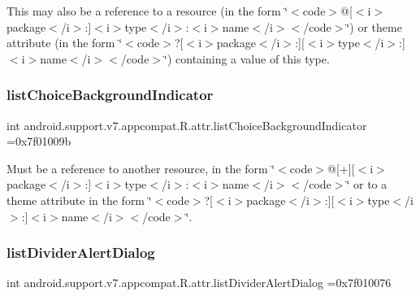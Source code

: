This may also be a reference to a resource (in the form \char`\"{}$<$code$>$@\mbox{[}$<$i$>$package$<$/i$>$\+:\mbox{]}$<$i$>$type$<$/i$>$\+:$<$i$>$name$<$/i$>$$<$/code$>$\char`\"{}) or theme attribute (in the form \char`\"{}$<$code$>$?\mbox{[}$<$i$>$package$<$/i$>$\+:\mbox{]}\mbox{[}$<$i$>$type$<$/i$>$\+:\mbox{]}$<$i$>$name$<$/i$>$$<$/code$>$\char`\"{}) containing a value of this type. \mbox{\label{classandroid_1_1support_1_1v7_1_1appcompat_1_1R_1_1attr_a8478bb010748f1d9c25576387050c212}} 
\subsubsection{\texorpdfstring{list\+Choice\+Background\+Indicator}{listChoiceBackgroundIndicator}}
{\footnotesize\ttfamily int android.\+support.\+v7.\+appcompat.\+R.\+attr.\+list\+Choice\+Background\+Indicator =0x7f01009b\hspace{0.3cm}{\ttfamily [static]}}

Must be a reference to another resource, in the form \char`\"{}$<$code$>$@\mbox{[}+\mbox{]}\mbox{[}$<$i$>$package$<$/i$>$\+:\mbox{]}$<$i$>$type$<$/i$>$\+:$<$i$>$name$<$/i$>$$<$/code$>$\char`\"{} or to a theme attribute in the form \char`\"{}$<$code$>$?\mbox{[}$<$i$>$package$<$/i$>$\+:\mbox{]}\mbox{[}$<$i$>$type$<$/i$>$\+:\mbox{]}$<$i$>$name$<$/i$>$$<$/code$>$\char`\"{}. \mbox{\label{classandroid_1_1support_1_1v7_1_1appcompat_1_1R_1_1attr_a74f718ff27616bea80007993e0549993}} 
\subsubsection{\texorpdfstring{list\+Divider\+Alert\+Dialog}{listDividerAlertDialog}}
{\footnotesize\ttfamily int android.\+support.\+v7.\+appcompat.\+R.\+attr.\+list\+Divider\+Alert\+Dialog =0x7f010076\hspace{0.3cm}{\ttfamily [static]}}


